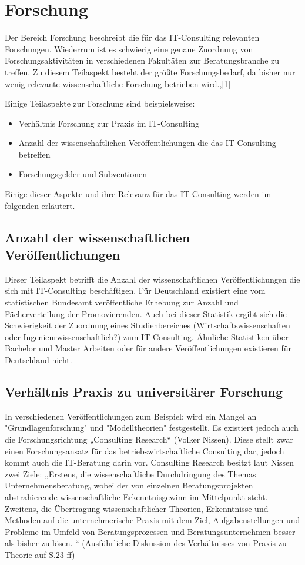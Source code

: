 \section{Forschung}
Der Bereich Forschung beschreibt die für das IT-Consulting relevanten Forschungen. Wiederrum ist es schwierig eine genaue Zuordnung von Forschungsaktivitäten in verschiedenen Fakultäten zur Beratungsbranche zu treffen. Zu diesem Teilaspekt besteht der größte Forschungsbedarf, da bisher nur wenig relevante wissenschaftliche Forschung betrieben wird.\cite[10]{nissen2007consulting},\cite{IDSScheer}[1]

Einige Teilaspekte zur Forschung sind beispielsweise:
\begin{itemize}
\item Verhältnis Forschung zur Praxis im IT-Consulting
\item Anzahl der wissenschaftlichen Veröffentlichungen die das IT Consulting betreffen
\item Forschungsgelder und Subventionen
\end{itemize}

Einige dieser Aspekte und ihre Relevanz für das IT-Consulting werden im folgenden erläutert.

\subsection{Anzahl der wissenschaftlichen Veröffentlichungen}
Dieser Teilaspekt betrifft die Anzahl der wissenschaftlichen Veröffentlichungen die sich mit IT-Consulting beschäftigen. 
Für Deutschland existiert eine vom statistischen Bundesamt veröffentliche Erhebung zur Anzahl und Fächerverteilung der Promovierenden.\cite{destatis}
Auch bei dieser Statistik ergibt sich die Schwierigkeit der Zuordnung eines Studienbereiches (Wirtschaftswissenschaften oder Ingenieurwissenschaftlich?) zum IT-Consulting. Ähnliche Statistiken über Bachelor und Master Arbeiten oder für andere Veröffentlichungen existieren für Deutschland nicht. 

\subsection{Verhältnis Praxis zu universitärer Forschung}
In verschiedenen Veröffentlichungen zum Beispiel: \cite[1]{IDSScheer} wird ein Mangel an "Grundlagenforschung" und "Modelltheorien" festgestellt. Es existiert jedoch auch die Forschungsrichtung „Consulting Research“ (Volker Nissen). Diese stellt zwar einen Forschungsansatz für das betriebswirtschaftliche Consulting dar, jedoch kommt auch  die IT-Beratung darin vor. Consulting Research besitzt laut Nissen zwei Ziele: „Erstens, die wissenschaftliche Durchdringung des Themas Unternehmensberatung, wobei der von einzelnen Beratungsprojekten abstrahierende wissenschaftliche Erkenntnisgewinn im Mittelpunkt steht. Zweitens, die Übertragung wissenschaftlicher Theorien, Erkenntnisse und Methoden auf die unternehmerische Praxis mit dem Ziel, Aufgabenstellungen und Probleme im Umfeld von Beratungsprozessen und Beratungsunternehmen besser als bisher zu lösen. “
(Ausführliche Diskussion des Verhältnisses von Praxis zu Theorie auf S.23 ff)

